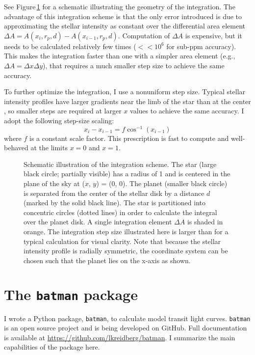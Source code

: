 \documentclass[12pt,preprint]{aastex}
\newcommand*{\blue}{\textcolor{blue}}
\begin{document}
See Figure\,\ref{fig:integration} for a schematic illustrating the geometry of the integration.  The advantage of this integration scheme is that the only error introduced is due to approximating the stellar intensity as constant over the differential area element $\Delta A = A(x_i, r_p, d) - A(x_{i-1}, r_p, d)$.  Computation of $\Delta A$ is expensive, but it needs to be calculated relatively few times ($<<10^{6}$ for sub-ppm accuracy). This makes the integration faster than one with a simpler area element (e.g., $\Delta A = \Delta x \Delta y$), that requires a much smaller step size to achieve the same accuracy.

To further optimize the integration, I use a nonuniform step size.  Typical stellar intensity profiles have larger gradients near the limb of the star than at the center \citep[e.g.][]{claret00}, so smaller steps are required at larger $x$ values to achieve the same accuracy.  I adopt the following step-size scaling: 
$$
x_i - x_{i-1}  = f\cos^{-1}\left(x_{i-1}\right)
$$  
where $f$ is a constant scale factor. This prescription is fast to compute and well-behaved at the limits $x=0$ and $x=1$.


\begin{figure}
\caption{Schematic illustration of the integration scheme. The star (large black circle; partially visible) has a radius of 1 and is centered in the plane of the sky at ($x$, $y$) = (0, 0). The planet (smaller black circle) is separated from the center of the stellar disk by a distance $d$ (marked by the solid black line).  The star is partitioned into concentric circles (dotted lines) in order to calculate the integral over the planet disk.  A single integration element $\Delta A$ is shaded in orange. The integration step size illustrated here is larger than for a typical calculation for visual clarity.  Note that because the stellar intensity profile is radially symmetric, the coordinate system can be chosen such that the planet lies on the x-axis as shown.}
\label{fig:integration}
\end{figure}

\section{The \texttt{batman} package}
I wrote a Python package, \texttt{batman}, to calculate model transit light curves.  \texttt{batman} is an open source project and is being developed on GitHub.  Full documentation is available at \blue{\url{https://github.com/lkreidberg/batman}}. I summarize the main capabilities of the package here.
\end{document}
